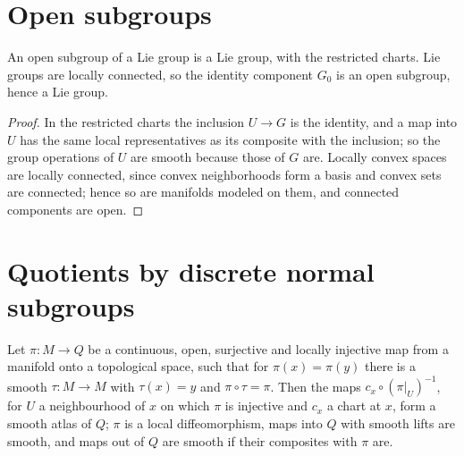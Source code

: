 \section{Open subgroups}

\begin{theorem}
  \label{thm:open-subgroup}
  \leanok
  An open subgroup of a Lie group is a Lie group, with the restricted charts. Lie groups are
  locally connected, so the identity component $G_0$ is an open subgroup, hence a Lie group.
\end{theorem}

\begin{proof}
  \leanok
  In the restricted charts the inclusion $U \to G$ is the identity, and a map into $U$ has the same
  local representatives as its composite with the inclusion; so the group operations of $U$ are
  smooth because those of $G$ are. Locally convex spaces are locally connected, since convex
  neighborhoods form a basis and convex sets are connected; hence so are manifolds modeled on
  them, and connected components are open.
\end{proof}

\section{Quotients by discrete normal subgroups}

\begin{theorem}
  \label{thm:smooth-quotient}
  \leanok
  Let $\pi \colon M \to Q$ be a continuous, open, surjective and locally injective map from a
  manifold onto a topological space, such that for $\pi(x) = \pi(y)$ there is a smooth
  $\tau \colon M \to M$ with $\tau(x) = y$ and $\pi \circ \tau = \pi$. Then the maps
  $c_x \circ (\pi|_U)^{-1}$, for $U$ a neighbourhood of $x$ on which $\pi$ is injective and $c_x$
  a chart at $x$, form a smooth atlas of $Q$; $\pi$ is a local diffeomorphism, maps into $Q$ with
  smooth lifts are smooth, and maps out of $Q$ are smooth if their composites with $\pi$ are.
\end{theorem}

